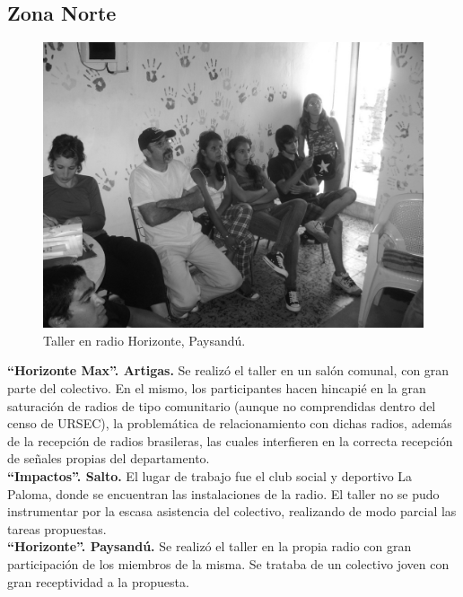\subsection{Zona Norte}
\begin{figure}[htbp!]
 \centering
 \includegraphics[scale=0.15,keepaspectratio=true]{./Cap/Fotos/HorizontePay.jpg}
 \caption{Taller en radio Horizonte, Paysandú.}
 \label{HorizontePay}
\end{figure}

\textbf{“Horizonte Max”. Artigas.} Se realizó el taller en un salón comunal, con gran parte del colectivo. En el mismo, los participantes hacen hincapié en la gran saturación de radios de tipo comunitario (aunque no comprendidas dentro del censo de URSEC), la problemática de relacionamiento con dichas radios, además de la recepción de radios brasileras, las cuales interfieren en la correcta recepción de señales propias del departamento.\\

\textbf{“Impactos”. Salto.} El lugar de trabajo fue el club social y deportivo La Paloma, donde se encuentran las instalaciones de la radio. El taller no se pudo instrumentar por la escasa asistencia del colectivo, realizando de modo parcial las tareas propuestas.\\

\textbf{“Horizonte”. Paysandú.} Se realizó el taller en la propia radio con gran participación de los miembros de la misma. Se trataba de un colectivo joven con gran receptividad a la propuesta.\\

